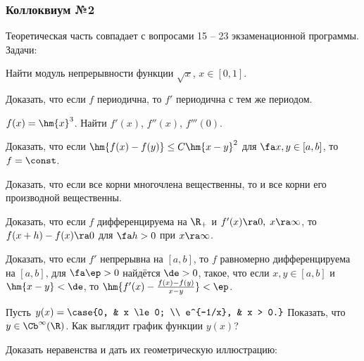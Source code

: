 \documentclass[a4paper]{article}
\begin{document}
\subsubsection{Коллоквиум №2}

Теоретическая часть совпадает с вопросами 15 -- 23 экзаменационной программы. Задачи:
\setcounter{problem}{0}
\begin{problem}
Найти модуль непрерывности функции $\sqrt{x}$, $x \in [0,1]$.
\end{problem}

\begin{problem}
Доказать, что если $f$ периодична, то $f'$ периодична с тем же периодом.
\end{problem}

\begin{problem}
$f(x) = \hm{x}^3$. Найти $f'(x)$, $f''(x)$, $f'''(0)$.
\end{problem}

\begin{problem}
Доказать, что если $\hm{f(x)-f(y)} \le C \hm{x-y}^2$ для $\fa x,y \in [a,b]$, то $f = \const$.
\end{problem}

\begin{problem}
Доказать, что если все корни многочлена вещественны, то и все корни его производной вещественны.
\end{problem}

\begin{problem}
Доказать, что если $f$ дифференцируема на $\R_+$ и $f'(x) \ra 0, \; x \ra \infty$, то
$f(x+h)-f(x) \ra 0$ для $\fa h > 0$ при $x \ra \infty$.
\end{problem}

\begin{problem}
Доказать, что если $f'$ непрерывна на $[a,b]$, то $f$ равномерно дифференцируема на $[a,b]$, 
для $\fa \ep > 0$ найдётся $\de > 0$, такое, что если $x,y \in [a,b]$ и $\hm{x-y} < \de$,
то $\hm{f'(x)-\frac{f(x)-f(y)}{x-y}} < \ep$.
\end{problem}

\begin{problem}
Пусть $y(x)=\case{0, & x \le 0; \\ e^{-1/x}, & x > 0.}$ Показать, что $y \in \Cb^\infty(\R)$. Как выглядит график
функции $y(x)$?
\end{problem}

\begin{problem}
Доказать неравенства и дать их геометрическую иллюстрацию:
\end{problem}
\end{document}
